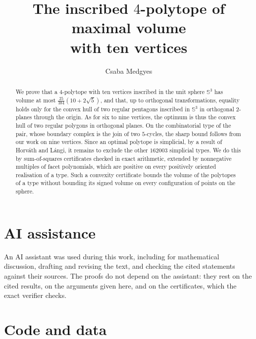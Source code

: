 \documentclass[11pt,reqno]{amsart}
\title[The inscribed $4$-polytope of maximal volume with ten vertices]
      {The inscribed $4$-polytope of maximal volume\\ with ten vertices}
\author{Csaba Medgyes}
\newcounter{artifact}
\theoremstyle{definition}
\begin{document}
\begin{abstract}
  We prove that a $4$-polytope with ten vertices inscribed in the unit sphere
  $\mathbb{S}^{3}$ has volume at most $\frac{25}{384}(10 + 2\sqrt{5})$, and
  that, up to orthogonal transformations, equality holds only for the convex
  hull of two regular pentagons inscribed in $\mathbb{S}^{3}$ in orthogonal
  $2$-planes through the origin. As for six to nine vertices, the optimum is
  thus the convex hull of two regular polygons in orthogonal planes. On the
  combinatorial type of the pair, whose boundary complex is the join of two
  $5$-cycles, the sharp bound follows from our work on nine vertices. Since an
  optimal polytope is simplicial, by a result of Horv\'ath and L\'angi, it
  remains to exclude the other $162003$ simplicial types. We do this by
  sum-of-squares certificates checked in exact arithmetic, extended by
  nonnegative multiples of facet polynomials, which are positive on every
  positively oriented realisation of a type. Such a convexity certificate bounds the volume of the
  polytopes of a type without bounding its signed volume on every
  configuration of points on the sphere.
\end{abstract}

\maketitle






\section*{AI assistance}

An AI assistant was used during this work, including for mathematical
discussion, drafting and revising the text, and checking the cited statements
against their sources. The proofs do not depend on the assistant: they rest on
the cited results, on the arguments given here, and on the certificates, which
the exact verifier checks.

\section*{Code and data}
\label{sec:artifacts}
\end{document}
